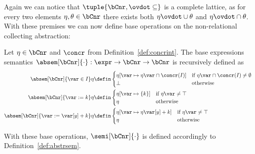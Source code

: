 Again we can notice that \(\tuple{\bCnr, \ovdot\subseteq}\) is a
complete lattice, as for every two elements \(\eta,\theta\in\bCnr\)
there exists both \(\eta \ovdot\cup \theta\) and
\(\eta \ovdot\cap \theta\). With these premises we can now define base
operations on the non-relational collecting abstraction:
\begin{definition}
  Let \(\eta \in \bCnr\) and \(\concr\) from
  Definition~\ref{def:concrint}. The base expressions semantics
  \(\absem[\bCnr]{\cdot} : \expr \to \bCnr \to \bCnr\) is recursively
  defined as
  \begin{align*}
    \absem[\bCnr]{\var\in I}\eta & \defin
                                   \begin{cases}
                                     \eta[\var\mapsto\eta\var\cap \concr(I)] & \text{if } \eta\var\cap \concr(I) \neq \emptyset \\
                                     \bot & \text{otherwise}
                                   \end{cases} \\
    \absem[\bCnr]{\var := k}\eta & \defin
                                   \begin{cases}
                                     \eta[\var\mapsto\{k\}] & \text{if } \eta\var\neq\top \\
                                     \eta & \text{otherwise}
                                   \end{cases} \\
    \absem[\bCnr]{\var := \var[y] + k}\eta & \defin
                                             \begin{cases}
                                               \eta[\var\mapsto\eta\var[y] + k] & \text{if } \eta\var\neq\top \\
                                               \eta & \text{otherwise}
                                             \end{cases}
  \end{align*}
\end{definition}
With these base operations, \(\semi[\bCnr]{\cdot}\) is defined
accordingly to Definition~\ref{def:abstrsem}.
